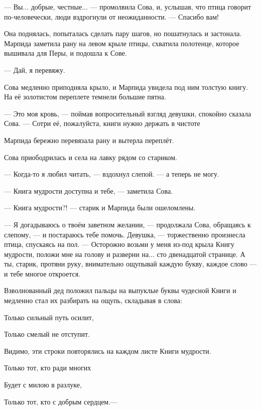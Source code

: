 \documentclass[12pt, a4paper, openany]{book}
\begin{document}
	— Вы... добрые, честные... — промолвила Сова, и, услышав, что птица говорит по-человечески, люди вздрогнули от неожиданности. — Спасибо вам!
	
	Она поднялась, попыталась сделать пару шагов, но пошатнулась и застонала. Марпида заметила рану на левом крыле птицы, схватила полотенце, которое вышивала для Перы, и подошла к Сове.
	
	— Дай, я перевяжу.
	
	Сова медленно приподняла крыло, и Марпида увидела под ним толстую книгу. На её золотистом переплете темнели большие пятна.
	
	— Это моя кровь, — поймав вопросительный взгляд девушки, спокойно сказала Сова. — Сотри её, пожалуйста, книги нужно держать в чистоте
	
	Марпида бережно перевязала рану и вытерла переплёт.
	
	Сова приободрилась и села на лавку рядом со стариком.
	
	— Когда-то я любил читать, — вздохнул слепой. — а теперь не могу.
	
	— Книга мудрости доступна и тебе, — заметила Сова.
	
	— Книга мудрости?! — старик и Марпида были ошеломлены.
	
	— Я догадываюсь о твоём заветном желании, — продолжала Сова, обращаясь к слепому, — и постараюсь тебе помочь. Девушка, — торжественно произнесла птица, спускаясь на пол. — Осторожно возьми у меня из-под крыла Книгу мудрости, положи мне на голову и разверни на... сто двенадцатой странице. А ты, старик, протяни руку, внимательно ощупывай каждую букву, каждое слово — и тебе многое откроется.
	
	Взволнованный дед положил пальцы на выпуклые буквы чудесной Книги и медленно стал их разбирать на ощупь, складывая в слова:
	
	
	
	
\qquad \qquad \qquad 	Только сильный путь осилит,
	
\qquad \qquad \qquad 	Только смелый не отступит.
	
	
	
	
	Видимо, эти строки повторялись на каждом листе Книги мудрости.
	
	
	
	
\qquad \qquad \qquad 	Только тот, кто ради многих
	
\qquad \qquad \qquad 	Будет с милою в разлуке,
	
\qquad \qquad \qquad 	Только тот, кто с добрым сердцем.—
	
\end{document}
